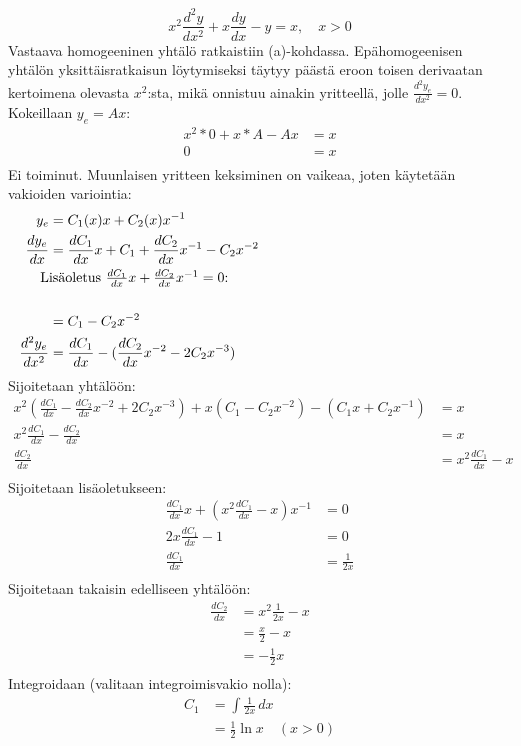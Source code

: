 \documentclass{article}
\begin{document}
\[
  x^2\frac{d^2 y}{d x^2} + x\frac{dy}{dx} - y = x, \quad x > 0
\]
Vastaava homogeeninen yhtälö ratkaistiin (a)-kohdassa.
Epähomogeenisen yhtälön yksittäis\-ratkai\-sun löytymiseksi täytyy päästä eroon
toisen derivaatan kertoimena olevasta $x^2$:sta, mikä onnistuu ainakin yritteellä,
jolle $\frac{d^2 y_e}{d x^2} = 0$. Kokeillaan $y_e = Ax$:
\begin{align*}
  x^2*0 + x*A - Ax &= x \\
  0 &= x \\
\end{align*}
Ei toiminut. Muunlaisen yritteen keksiminen on vaikeaa, joten käytetään
vakioiden variointia:
\begin{align*}
  y_e &= C_1(x)x + C_2(x)x^{-1} \\
  \frac{dy_e}{dx} &= \frac{dC_1}{dx}x + C_1 + \frac{dC_2}{dx}x^{-1} - C_2x^{-2} \\
  \noalign{\text{Lisäoletus $\frac{dC_1}{dx}x + \frac{dC_2}{dx}x^{-1} = 0$:}} \\
                  &= C_1 - C_2x^{-2} \\
  \frac{d^2 y_e}{d x^2} &= \frac{dC_1}{dx} - (\frac{dC_2}{dx}x^{-2} - 2C_2x^{-3}) \\
\end{align*}
Sijoitetaan yhtälöön:
\begin{align*}
  x^2(\frac{dC_1}{dx} - \frac{dC_2}{dx}x^{-2} + 2C_2x^{-3})
  + x(C_1 - C_2x^{-2}) - (C_1x + C_2x^{-1}) &= x \\
  x^2\frac{dC_1}{dx} - \frac{dC_2}{dx} &= x \\
  \frac{dC_2}{dx} &= x^2\frac{dC_1}{dx} - x \\
\end{align*}
Sijoitetaan lisäoletukseen:
\begin{align*}
  \frac{dC_1}{dx}x + (x^2\frac{dC_1}{dx} - x)x^{-1} &= 0 \\
  2x\frac{dC_1}{dx} - 1 &= 0 \\
  \frac{dC_1}{dx} &= \frac{1}{2x} \\
\end{align*}
Sijoitetaan takaisin edelliseen yhtälöön:
\begin{align*}
  \frac{dC_2}{dx} &= x^2\frac{1}{2x} - x \\
                  &= \frac{x}{2} - x \\
                  &= -\frac{1}{2}x \\
\end{align*}
Integroidaan (valitaan integroimisvakio nolla):
\begin{align*}
  C_1 &= \int \frac{1}{2x}\,dx \\
      &= \frac{1}{2}\ln x \quad (x > 0) \\
\end{align*}
\end{document}
